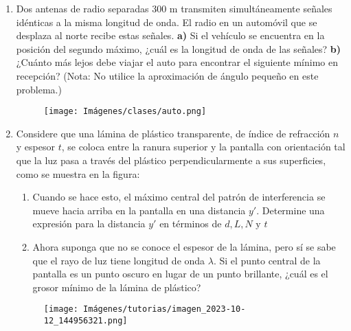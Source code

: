 \documentclass[letterpaper,11pt]{article}
\begin{document}
\begin{enumerate}
\begin{multicols}{2}
    \columnbreak
    \begin{figure}[H]
        \centering
        \texttt{[image: Imágenes/tutorias/imagen\_2023-10-12\_145443062.png]}
    \end{figure}
\end{multicols}

\item 
\begin{multicols}{2}
 Dos antenas de radio separadas 300 m transmiten simultáneamente señales idénticas a la misma longitud de onda. El radio en un automóvil que se desplaza al norte recibe estas señales. \textbf{a)} Si el vehículo se encuentra en la posición del segundo máximo, ¿cuál es la longitud de onda de las señales? \textbf{b)} ¿Cuánto más lejos debe viajar el auto para encontrar el siguiente mínimo en recepción? (Nota: No utilice la aproximación de ángulo pequeño en este problema.)

    \columnbreak
    
    \begin{figure}[H]
        \centering
        \texttt{[image: Imágenes/clases/auto.png]}
    \end{figure}
\end{multicols}

\item Considere que una lámina de plástico transparente, de índice de refracción $n$ y espesor $t$, se coloca entre la ranura superior y la pantalla con orientación tal que la luz pasa a través del plástico perpendicularmente a sus superficies, como se muestra en la figura:

\begin{multicols}{2}
    \begin{enumerate}
        \item Cuando se hace esto, el máximo central del patrón de interferencia se mueve hacia arriba en la pantalla en una distancia $y'$. Determine una expresión para la distancia $y'$ en términos de $d, L, N \text{ y } t$
    
        \item Ahora suponga que no se conoce el espesor de la lámina, pero sí se sabe que el rayo de luz tiene longitud de onda $\lambda$. Si el punto central de la pantalla es un punto oscuro en lugar de un punto brillante, ¿cuál es el grosor mínimo de la lámina de plástico?
    \end{enumerate}
    \columnbreak
    \begin{figure}[H]
        \centering
        \texttt{[image: Imágenes/tutorias/imagen\_2023-10-12\_144956321.png]}
    \end{figure}
\end{multicols}

%   

\end{enumerate}
\end{document}

